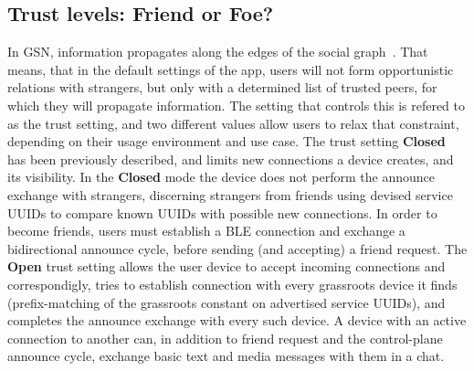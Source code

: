 \subsection{Trust levels: Friend or Foe?}
\label{subsec:trust}
In GSN, information propagates along the edges of the social graph~\cite{Shapiro2023}. That means, that in the default settings of the app, users will not form opportunistic relations with strangers, but only with a determined list of trusted peers, for which they will propagate information.
The setting that controls this is refered to as the trust setting, and two different values allow users to relax that constraint, depending on their usage environment and use case.
The trust setting \textbf{Closed} has been previously described, and limits new connections a device creates, and its visibility.
In the \textbf{Closed} mode the device does not perform the announce exchange with strangers, discerning strangers from friends using devised service UUIDs to compare known UUIDs with possible new connections.
In order to become friends, users must establish a BLE connection and exchange a bidirectional announce cycle, before sending (and accepting) a friend request.
The \textbf{Open} trust setting allows the user device to accept incoming connections and correspondigly, tries to establish connection with every grassroots device it finds (prefix-matching of the grassroots constant on advertised service UUIDs), and completes the announce exchange with every such device.
A device with an active connection to another can, in addition to friend request and the control-plane announce cycle, exchange basic text and media messages with them in a chat.


